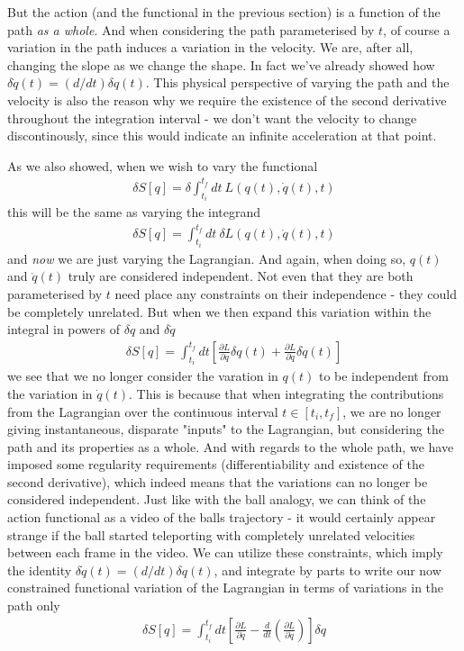 \documentclass[a4paper]{article}
\begin{document}
    But the action (and the functional in the previous section) is a function of the path \textit{as a whole}. And when considering the path parameterised by \(t\), of course a variation in the path induces a variation in the velocity. We are, after all, changing the slope as we change the shape. In fact we've already showed how \(\delta \dot{q} (t) = (d / dt)\delta q(t)\). This physical perspective of varying the path and the velocity is also the reason why we require the existence of the second derivative throughout the integration interval - we don't want the velocity to change discontinously, since this would indicate an infinite acceleration at that point.
    
    As we also showed, when we wish to vary the functional \begin{align*}
        \delta S[q] = \delta \int _{t_i}^{t_f} dt\ L(q(t), \dot{q}(t), t)
    \end{align*}
    this will be the same as varying the integrand \begin{align*}
        \delta S[q] = \int _{t_i}^{t_f} dt\ \delta L(q(t), \dot{q}(t), t)
    \end{align*}
    and \textit{now} we are just varying the Lagrangian. And again, when doing so, \(q(t)\) and \(\dot{q}(t)\) truly are considered independent. Not even that they are both parameterised by \(t\) need place any constraints on their independence - they could be completely unrelated. But when we then expand this variation within the integral in powers of \(\delta q\) and \(\delta \dot{q} \)  
    \begin{align*}
        \delta S[q] = \int _{t_i}^{t_f} dt \left[ \frac{\partial L}{\partial q}\delta q(t) + \frac{\partial L}{\partial \dot{q} }\delta \dot{q}(t) \right] 
    \end{align*}
    we see that we no longer consider the varation in \(q(t)\) to be independent from the variation in \(\dot{q} (t)\). This is because that when integrating the contributions from the Lagrangian over the continuous interval \(t \in [t_i, t_f]\), we are no longer giving instantaneous, disparate "inputs" to the Lagrangian, but considering the path and its properties as a whole. And with regards to the whole path, we have imposed some regularity requirements (differentiability and existence of the second derivative), which indeed means that the variations can no longer be considered independent. Just like with the ball analogy, we can think of the action functional as a video of the balls trajectory - it would certainly appear strange if the ball started teleporting with completely unrelated velocities between each frame in the video. We can utilize these constraints, which imply the identity \(\delta \dot{q} (t) = (d / dt)\delta q(t)\), and integrate by parts to write our now constrained functional variation of the Lagrangian in terms of variations in the path only \begin{align*}
        \delta S[q] = \int _{t_i}^{t_f} dt \left[ \frac{\partial L}{\partial q} - \frac{d}{dt} \left(  \frac{\partial L}{\partial \dot{q} } \right)\right] \delta q
    \end{align*}
\end{document}
